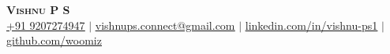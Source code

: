 \begin{center}
	\textbf{\huge \scshape Vishnu P S} \\ \vspace{4pt}
	\href{tel:+919207274947}{\underline{+91 9207274947}} $|$
	\href{mailto:vishnups.connect@gmail.com}{\underline{vishnups.connect@gmail.com}} $|$
	\href{https://www.linkedin.com/in/vishnu-ps1}{\underline{linkedin.com/in/vishnu-ps1}} $|$
	\href{https://www.github.com/woomiz}{\underline{github.com/woomiz}} \\
\end{center}

